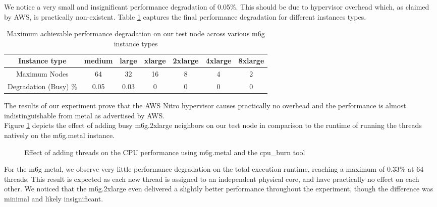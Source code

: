 \noindent
We notice a very small and insignificant performance  degradation of 0.05\%. This should be due 
to hypervisor overhead which, as claimed by AWS, is practically non-existent. 
Table \ref{tab::max_m6g} captures the final performance degradation for different instances types. 
\begin{table}[H]
\begin{center}
\begin{tabular}{ c|c|c|c|c|c|c }
 Instance type & medium & large & xlarge & 2xlarge & 4xlarge  & 8xlarge  \\
 \hline
 Maximum Nodes & 64 & 32 & 16 & 8 & 4 & 2 \\
\hline
Degradation (Busy) \%& 0.05 & 0.03 & 0 & 0 & 0 & 0  \\
\end{tabular}
\end{center}
\caption{Maximum achievable performance degradation on our test node across various m6g instance types}
\label{tab::max_m6g}
\end{table}
\noindent
The results of our experiment prove that the AWS Nitro hypervisor causes practically no overhead and 
the performance is almost indistinguishable from metal as advertised by AWS. \\
Figure \ref{fig::m6g_metal_vs_VMs} depicts the effect of adding busy m6g.2xlarge neighbors on our 
test node in comparison to the runtime of running the threads natively on 
the m6g.metal instance. 
\begin{figure}[H]
\centering
{}
\caption{Effect of adding threads on the CPU performance using m6g.metal and the cpu\_burn tool}
\label{fig::m6g_metal_vs_VMs}
\end{figure}
\noindent
For the m6g metal, we observe very little performance degradation on the total execution runtime,
reaching a maximum of 0.33\% at 64 threads. This result is expected as each new thread is assigned to 
an independent physical core, and have practically no effect on each other. 
We noticed that the m6g.2xlarge even delivered a slightly better performance throughout 
the experiment, though the difference was minimal and likely insignificant.